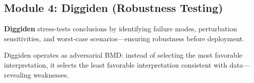 \subsection{Module 4: Diggiden (Robustness Testing)}

\begin{definition}
\textbf{Diggiden} stress-tests conclusions by identifying failure modes, perturbation sensitivities, and worst-case scenarios—ensuring robustness before deployment.
\end{definition}

\begin{theorem}
Diggiden operates as adversarial BMD: instead of selecting the most favorable interpretation, it selects the least favorable interpretation consistent with data—revealing weaknesses.
\end{theorem}

